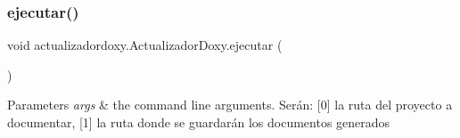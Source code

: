 \subsubsection{\texorpdfstring{ejecutar()}{ejecutar()}}
{\footnotesize\ttfamily void actualizadordoxy.\+Actualizador\+Doxy.\+ejecutar (\begin{DoxyParamCaption}{ }\end{DoxyParamCaption})\hspace{0.3cm}{\ttfamily [inline]}}


\begin{DoxyParams}{Parameters}
{\em args} & the command line arguments. Serán\+: \mbox{[}0\mbox{]} la ruta del proyecto a documentar, \mbox{[}1\mbox{]} la ruta donde se guardarán los documentos generados \\
\hline
\end{DoxyParams}

